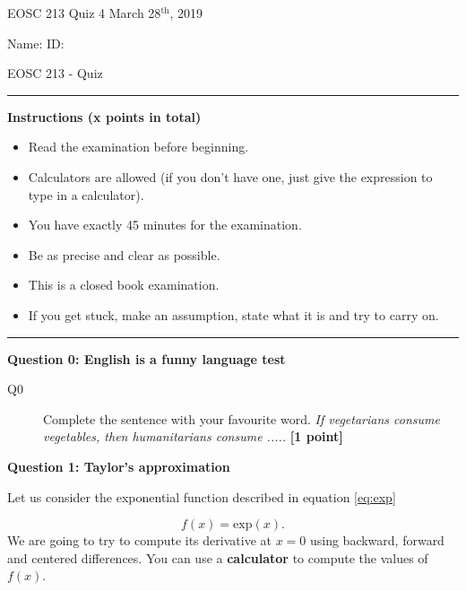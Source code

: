 \documentclass{article}
\begin{document}
\pagestyle{empty}

\large{EOSC 213 Quiz 4} \hspace{10cm} \large{March 28$^{\textrm{th}}$, 2019}

\large{Name:} \hspace{12cm} \large{ID: }
\begin{center}
\Huge{EOSC 213 - Quiz}
\end{center}

\rule{\textwidth}{1pt}

\large{\textbf{Instructions (x points in total)}}
\begin{multicols}{2}
\begin{itemize}
\item Read the examination before beginning.
\item Calculators are allowed (if you don't have one, just give the expression to type in a calculator).
\item You have exactly 45 minutes for the examination.
\item Be as precise and clear as possible.
\item This is a closed book examination.
\item If you get stuck, make an assumption, state what it is and try to carry on.
\end{itemize} 
\end{multicols}



\rule{\textwidth}{1pt}

\textbf{Question 0: English is a funny language test}

\begin{description}
\item [Q0] Complete the sentence with your favourite word. \textit{If vegetarians consume vegetables, then humanitarians consume .....}  \textbf{[1 point]}
\vspace{0.5cm}

\end{description}

\textbf{Question 1: Taylor's approximation}

Let us consider the exponential function described in equation \ref{eq:exp}

\begin{equation}
f(x) = \mathrm{exp}(x). \label{eq:exp}
\end{equation} We are going to try to compute its derivative at $x = 0$ using backward, forward and centered differences. You can use a \textbf{calculator} to compute the values of $f(x)$.
\end{document}
